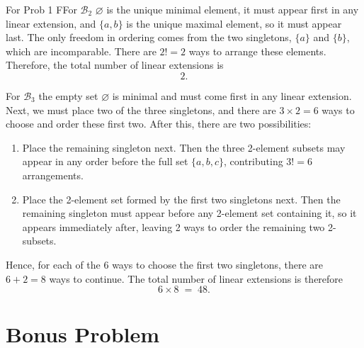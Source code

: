 \documentclass{report}
\begin{document}
\begin{RemarkWithLily}{For Prob 1}
  FFor $\mathcal{B}_2$ $\varnothing$ is the unique minimal element, it must appear first in any linear extension, and $\{a,b\}$ is the unique maximal element, so it must appear last. The only freedom in ordering comes from the two singletons, $\{a\}$ and $\{b\}$, which are incomparable. There are $2! = 2$ ways to arrange these elements. Therefore, the total number of linear extensions is 
  \[
  2.
  \]

  \medskip

  For $\mathcal{B}_3$ the empty set $\varnothing$ is minimal and must come first in any linear extension.  
  Next, we must place two of the three singletons, and there are $3\times 2=6$ ways to choose and order these first two.  
  After this, there are two possibilities:
  \begin{enumerate}
  \item Place the remaining singleton next. Then the three 2-element subsets may appear in any order before the full set $\{a,b,c\}$, contributing $3!=6$ arrangements.
  \item Place the 2-element set formed by the first two singletons next. Then the remaining singleton must appear before any 2-element set containing it, so it appears immediately after, leaving 2 ways to order the remaining two 2-subsets.
  \end{enumerate}
  Hence, for each of the $6$ ways to choose the first two singletons, there are $6 + 2 = 8$ ways to continue.  The total number of linear extensions is therefore
  \[
  6 \times 8 \;=\; 48.
  \]
\end{RemarkWithLily}


\newpage 



\section*{Bonus Problem}

\end{document}
